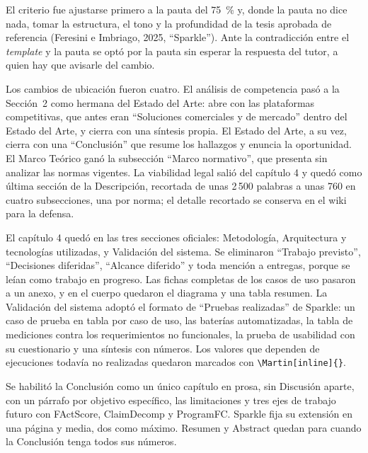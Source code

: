 El criterio fue ajustarse primero a la pauta del 75~\% y, donde la pauta no dice nada, tomar la estructura, el tono y la profundidad de la tesis aprobada de referencia (Feresini e Imbriago, 2025, \enquote{Sparkle}). Ante la contradicción entre el \emph{template} y la pauta se optó por la pauta sin esperar la respuesta del tutor, a quien hay que avisarle del cambio.

Los cambios de ubicación fueron cuatro. El análisis de competencia pasó a la Sección~2 como hermana del Estado del Arte: abre con las plataformas competitivas, que antes eran \enquote{Soluciones comerciales y de mercado} dentro del Estado del Arte, y cierra con una síntesis propia. El Estado del Arte, a su vez, cierra con una \enquote{Conclusión} que resume los hallazgos y enuncia la oportunidad. El Marco Teórico ganó la subsección \enquote{Marco normativo}, que presenta sin analizar las normas vigentes. La viabilidad legal salió del capítulo 4 y quedó como última sección de la Descripción, recortada de unas 2\,500 palabras a unas 760 en cuatro subsecciones, una por norma; el detalle recortado se conserva en el wiki para la defensa.

El capítulo 4 quedó en las tres secciones oficiales: Metodología, Arquitectura y tecnologías utilizadas, y Validación del sistema. Se eliminaron \enquote{Trabajo previsto}, \enquote{Decisiones diferidas}, \enquote{Alcance diferido} y toda mención a entregas, porque se leían como trabajo en progreso. Las fichas completas de los casos de uso pasaron a un anexo, y en el cuerpo quedaron el diagrama y una tabla resumen. La Validación del sistema adoptó el formato de \enquote{Pruebas realizadas} de Sparkle: un caso de prueba en tabla por caso de uso, las baterías automatizadas, la tabla de mediciones contra los requerimientos no funcionales, la prueba de usabilidad con su cuestionario y una síntesis con números. Los valores que dependen de ejecuciones todavía no realizadas quedaron marcados con \texttt{\textbackslash Martin[inline]\{\}}.

Se habilitó la Conclusión como un único capítulo en prosa, sin Discusión aparte, con un párrafo por objetivo específico, las limitaciones y tres ejes de trabajo futuro con FActScore, ClaimDecomp y ProgramFC. Sparkle fija su extensión en una página y media, dos como máximo. Resumen y Abstract quedan para cuando la Conclusión tenga todos sus números.

